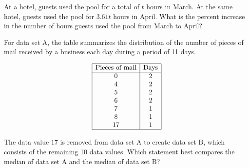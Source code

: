 \vspace{2em}
\newpage

\noindent\markforreview
\vspace{1em}

At a hotel, guests used the pool for a total of $t$ hours in March. At the same hotel, guests used the pool for $3.61t$ hours in April.  
What is the percent increase in the number of hours guests used the pool from March to April?

\vspace{0.75em}


\vspace{2em}
\newpage

\noindent\markforreview
\vspace{1em}

For data set A, the table summarizes the distribution of the number of pieces of mail received by a business each day during a period of 11 days.

\[
\begin{array}{|c|c|}
\hline
\text{Pieces of mail} & \text{Days} \\
\hline
0 & 2 \\
4 & 2 \\
5 & 2 \\
6 & 2 \\
7 & 1 \\
8 & 1 \\
17 & 1 \\
\hline
\end{array}
\]

The data value $17$ is removed from data set A to create data set B, which consists of the remaining 10 data values.  
Which statement best compares the median of data set A and the median of data set B?

\vspace{0.75em}


\vspace{2em}
\newpage

\noindent\markforreview
\vspace{1em}

